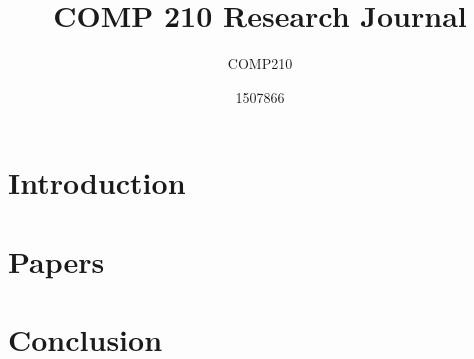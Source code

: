 \documentclass{scrartcl}
\title{COMP 210 Research Journal}
\subtitle{COMP210}
\author{1507866}
\begin{document}
	
\maketitle
	
\abstract{}
	
\section{Introduction}

\section{Papers}


\section{Conclusion}

	


	
\end{document}
